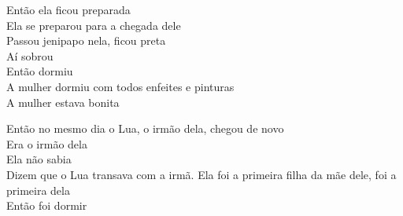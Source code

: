 \smallskip
\begin{center}\end{center}
\smallskip

\noindent Então ela ficou preparada\\
Ela se preparou para a chegada dele\\
Passou jenipapo nela, ficou preta\\
Aí sobrou\\
Então dormiu\\
A mulher dormiu com todos enfeites e pinturas\\
A mulher estava bonita

\smallskip
\begin{center}\end{center}
\smallskip

\noindent Então no mesmo dia o Lua, o irmão dela, chegou de novo\\
Era o irmão dela\\
Ela não sabia\\
Dizem que o Lua transava com a irmã. Ela foi a primeira filha da mãe dele, foi a primeira dela\\
Então foi dormir

\smallskip
\begin{center}\end{center}
\smallskip


